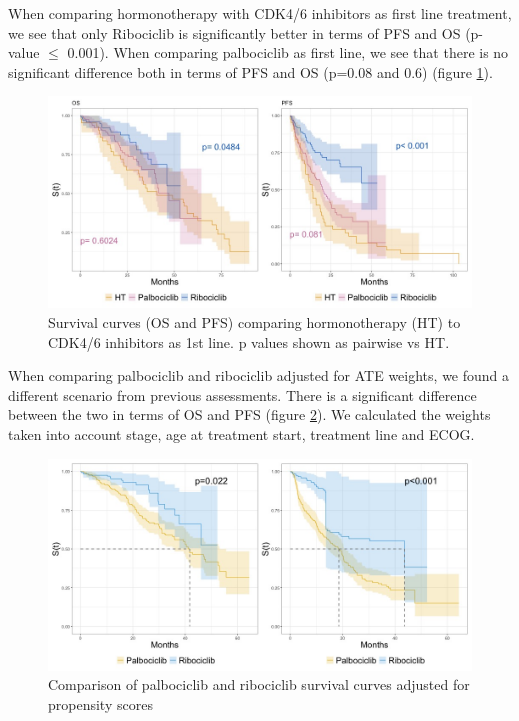 When comparing hormonotherapy with CDK4/6 inhibitors as first line treatment, we see that only Ribociclib is significantly better in terms of PFS and OS (p-value $\le$ 0.001). When comparing palbociclib as first line, we see that there is no significant difference both in terms of PFS and OS (p=0.08 and 0.6)
(figure \ref*{fig:grouped}).
\begin{figure}[ht]
  \centering

  \caption{Survival curves (OS and PFS) comparing hormonotherapy (HT) to CDK4/6 inhibitors as 1st line. p values shown as pairwise vs HT. }\label{fig:grouped} 
  \includegraphics[scale=0.4]{figures/grouped_curve_both.jpeg}%

\end{figure}

When comparing palbociclib and ribociclib adjusted for ATE weights, we found a different scenario from previous assessments. There is a significant difference between the two in terms of OS and PFS (figure \ref*{fig:propensity}). We calculated the weights taken into account stage, age at treatment start, treatment line and ECOG.

\begin{figure}[ht]
  \centering

  \caption{Comparison of palbociclib and ribociclib survival curves adjusted for propensity scores  }\label{fig:propensity} 
  \includegraphics[scale=0.35]{figures/propensity_score_both.jpeg}%

\end{figure}

